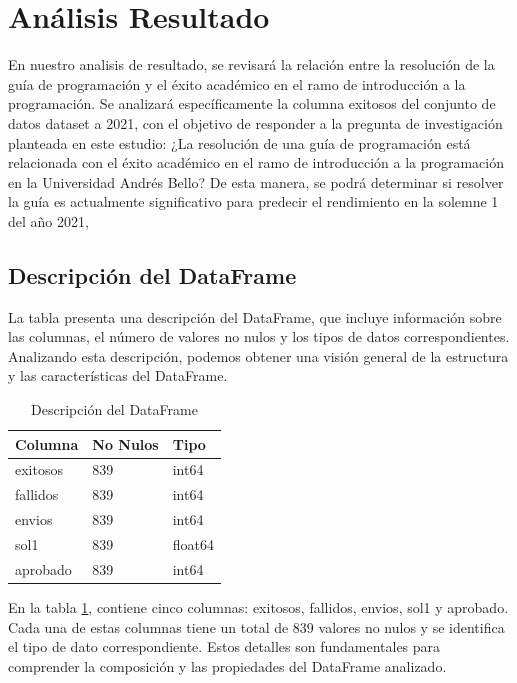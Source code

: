 \hypertarget{analisis_resultado}{%
    \section{Análisis Resultado}\label{Análisis Resultado}}

En nuestro analisis de resultado, se revisará la relación entre la resolución
de la guía de programación y el éxito académico en el ramo de introducción a la
programación. Se analizará específicamente la columna exitosos del conjunto de
datos dataset a 2021, con el objetivo de responder a la pregunta de
investigación planteada en este estudio: ¿La resolución de una guía de
programación está relacionada con el éxito académico en el ramo de introducción
a la programación en la Universidad Andrés Bello? De esta manera, se podrá
determinar si resolver la guía es actualmente significativo para predecir el
rendimiento en la solemne 1 del año 2021,

\subsection{Descripción del DataFrame}

La tabla presenta una descripción del DataFrame, que incluye información sobre
las columnas, el número de valores no nulos y los tipos de datos
correspondientes. Analizando esta descripción, podemos obtener una visión
general de la estructura y las características del DataFrame.

\begin{table}[htbp]
    \centering
    \caption{Descripción del DataFrame}
    \begin{tabular}{lll}
        \hline
        \textbf{Columna} & \textbf{No Nulos} & \textbf{Tipo} \\
        \hline
        exitosos         & 839               & int64         \\
        fallidos         & 839               & int64         \\
        envios           & 839               & int64         \\
        sol1             & 839               & float64       \\
        aprobado         & 839               & int64         \\
        \hline
    \end{tabular}%
    \label{tab:descripcion_dataframe}%
\end{table}%

En la tabla \ref{tab:descripcion_dataframe}, contiene cinco columnas: exitosos,
fallidos, envios, sol1 y aprobado. Cada una de estas columnas tiene un total de
839 valores no nulos y se identifica el tipo de dato correspondiente. Estos
detalles son fundamentales para comprender la composición y las propiedades del
DataFrame analizado.

